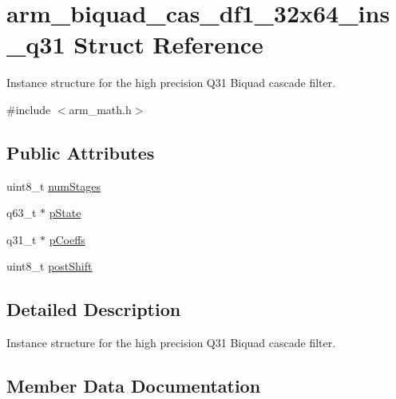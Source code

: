 \hypertarget{structarm__biquad__cas__df1__32x64__ins__q31}{}\section{arm\+\_\+biquad\+\_\+cas\+\_\+df1\+\_\+32x64\+\_\+ins\+\_\+q31 Struct Reference}
\label{structarm__biquad__cas__df1__32x64__ins__q31}


Instance structure for the high precision Q31 Biquad cascade filter.  




{\ttfamily \#include $<$arm\+\_\+math.\+h$>$}

\subsection*{Public Attributes}
\begin{DoxyCompactItemize}
\item 
uint8\+\_\+t \hyperlink{structarm__biquad__cas__df1__32x64__ins__q31_ad7cb9a9f5df8f4fcfc7a0b633672e574}{num\+Stages}
\item 
q63\+\_\+t $\ast$ \hyperlink{structarm__biquad__cas__df1__32x64__ins__q31_a4c899cdfaf2bb955323e93637bd662e0}{p\+State}
\item 
q31\+\_\+t $\ast$ \hyperlink{structarm__biquad__cas__df1__32x64__ins__q31_a490462d6ebe0fecfb6acbf51bed22ecf}{p\+Coeffs}
\item 
uint8\+\_\+t \hyperlink{structarm__biquad__cas__df1__32x64__ins__q31_a8e9d58e8dba5aa3b2fc4f36d2ed07996}{post\+Shift}
\end{DoxyCompactItemize}


\subsection{Detailed Description}
Instance structure for the high precision Q31 Biquad cascade filter. 

\subsection{Member Data Documentation}

